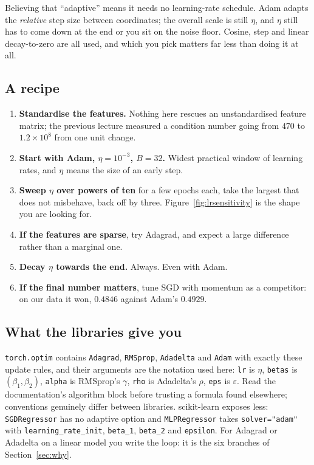\documentclass[11pt]{article}
\begin{document}
\begin{caution}
Believing that ``adaptive'' means it needs no learning-rate schedule. Adam
adapts the \emph{relative} step size between coordinates; the overall
scale is still $\eta$, and $\eta$ still has to come down at the end or you sit
on the noise floor. Cosine, step and linear decay-to-zero are all used, and
which you pick matters far less than doing it at all.
\end{caution}

\subsection{A recipe}

\begin{enumerate}[leftmargin=*]
  \item \textbf{Standardise the features.} Nothing here rescues an
    unstandardised feature matrix; the previous lecture measured a condition
    number going from $470$ to $1.2\times10^8$ from one unit change.
  \item \textbf{Start with Adam, $\eta = 10^{-3}$, $B = 32$.} Widest practical
    window of learning rates, and $\eta$ means the size of an early step.
  \item \textbf{Sweep $\eta$ over powers of ten} for a few epochs each, take
    the largest that does not misbehave, back off by three.
    Figure~\ref{fig:lrsensitivity} is the shape you are looking for.
  \item \textbf{If the features are sparse}, try Adagrad, and expect a large
    difference rather than a marginal one.
  \item \textbf{Decay $\eta$ towards the end.} Always. Even with Adam.
  \item \textbf{If the final number matters}, tune SGD with momentum as a
    competitor: on our data it won, $0.4846$ against Adam's $0.4929$.
\end{enumerate}

\subsection{What the libraries give you}

\begin{sloppypar}
\texttt{torch.optim} contains \texttt{Adagrad}, \texttt{RMSprop},
\texttt{Adadelta} and \texttt{Adam} with exactly these update rules, and their
arguments are the notation used here: \texttt{lr} is $\eta$, \texttt{betas} is
$(\beta_1,\beta_2)$, \texttt{alpha} is RMSprop's $\gamma$, \texttt{rho} is
Adadelta's $\rho$, \texttt{eps} is $\varepsilon$. Read the documentation's
algorithm block before trusting a formula found elsewhere; conventions
genuinely differ between libraries. scikit-learn exposes less:
\texttt{SGDRegressor} has no adaptive option and \texttt{MLPRegressor} takes
\texttt{solver="adam"} with \texttt{learning\_rate\_init}, \texttt{beta\_1},
\texttt{beta\_2} and \texttt{epsilon}. For Adagrad or Adadelta on a linear
model you write the loop: it is the six branches of Section~\ref{sec:why}.
\end{sloppypar}
\end{document}
